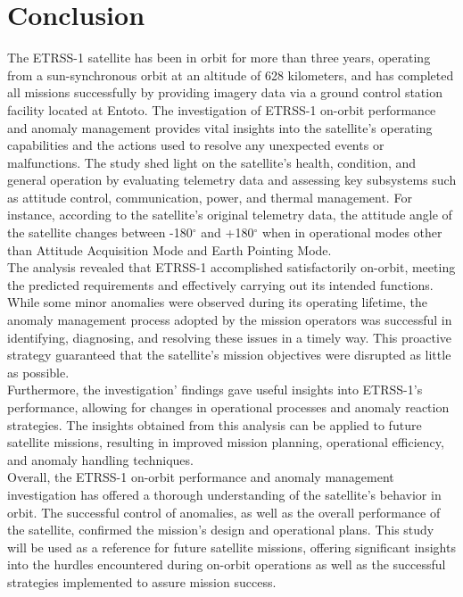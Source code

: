 \documentclass[final,5p,times,twocolumn]{elsarticle}
\begin{document}
\section{Conclusion}
The ETRSS-1 satellite has been in orbit for more than three years, operating from a sun-synchronous orbit at an altitude of 628 kilometers, and has completed all missions successfully by providing imagery data via a ground control station facility located at Entoto. 
The investigation of ETRSS-1 on-orbit performance and anomaly management provides vital insights into the satellite's operating capabilities and the actions used to resolve any unexpected events or malfunctions. The study shed light on the satellite's health, condition, and general operation by evaluating telemetry data and assessing key subsystems such as attitude control, communication, power, and thermal management. For instance, according to the satellite's original telemetry data, the attitude angle of the satellite changes between -180$^{\circ}$ and +180$^{\circ}$ when in operational modes other than Attitude Acquisition Mode and Earth Pointing Mode.  \\
The analysis revealed that ETRSS-1 accomplished satisfactorily on-orbit, meeting the predicted requirements and effectively carrying out its intended functions. While some minor anomalies were observed during its operating lifetime, the anomaly management process adopted by the mission operators was successful in identifying, diagnosing, and resolving these issues in a timely way. This proactive strategy guaranteed that the satellite's mission objectives were disrupted as little as possible.\\
Furthermore, the investigation' findings gave useful insights into ETRSS-1's performance, allowing for changes in operational processes and anomaly reaction strategies. The insights obtained from this analysis can be applied to future satellite missions, resulting in improved mission planning, operational efficiency, and anomaly handling techniques.\\
Overall, the ETRSS-1 on-orbit performance and anomaly management investigation has offered a thorough understanding of the satellite's behavior in orbit. The successful control of anomalies, as well as the overall performance of the satellite, confirmed the mission's design and operational plans. This study will be used as a reference for future satellite missions, offering significant insights into the hurdles encountered during on-orbit operations as well as the successful strategies implemented to assure mission success.
\end{document}
